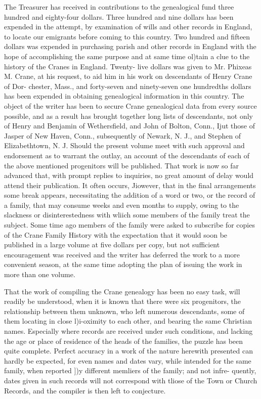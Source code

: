 \documentclass{book}
\begin{document}
The Treasurer has received in contributions to the genealogical 
fund three hundred and eighty-four dollars. Three hundred and 
nine dollars has been expended in the attempt, by examination of 
wills and other records in England, to locate our emigrants before 
coming to this country. Two hundred and fifteen dollars was 
expended in purchasing parish and other records in England with 
the hope of accomplishing the same purpose and at same time 
ol)tain a clue to the history of the Cranes in England. Twenty- 
live dollars was given to Mr. Phixeas M. Crane, at his request, 
to aid him in his work on descendants of Henry Crane of Dor- 
chester, Mass., and forty-seven and ninety-seven one hundredths 
dollars has been expended in obtaining genealogical information 
in this country. The object of the writer has been to secure 
Crane genealogical data from every source possible, and as a 
result has brought together long lists of descendants, not only of 
Henry and Benjamin of Wethersfield, and John of Bolton, 
Conn., Ijut those of Jasper of New Haven, Conn., subsequently 
of Newark, N. J., and Stephen of Elizabethtown, N. J. Should 
the present volume meet with such approval and endorsement as 
to warrant the outlay, an account of the descendants of each of 
the above mentioned progenitors will be published. That work 
is now so far advanced that, with prompt replies to inquiries, no 
great amount of delay would attend their publication. It often 
occurs, Jiowever, that in the final arrangements some break 
appears, necessitating the addition of a word or two, or the 
record of a family, that may consume weeks and even months to 
supply, owing to the slackness or disinterestedness with wliich 
some members of the family treat the subject. Some time ago 
members of the family were asked to subscribe for copies of the 
Crane Family History with the expectation that it would soon 
be published in a large volume at five dollars per copy, but not 
sufficient encouragement was received and the writer has deferred 
the work to a more convenient season, at the same time adopting 
the plan of issuing the work in more than one volume. 

That the work of compiling the Crane genealogy has been no 
easy task, will readily be understood, when it is known that there 
were six progenitors, the relationship between them unknown, 
who left numerous descendants, some of them locating in close 
l)i-oximity to each other, and bearing the same Christian names. 
Especially where records are received under such conditions, and 
lacking the age or place of residence of the heads of the families, 
the puzzle has been quite complete. Perfect accuracy in a work 
of the nature herewith presented can hardly be expected, for even 
names and dates vary, while intended for the same family, when 
reported ])y different memliers of the family; and not infre- 
quently, dates given in such records will not correspond with 
tliose of the Town or Church Records, and the compiler is then 
left to conjecture. 
\end{document}
